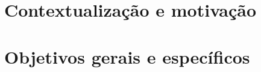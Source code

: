 \chapter{Contextualização e motivação}



\lipsum[100]


\chapter{Objetivos gerais e específicos}



\lipsum[100]


